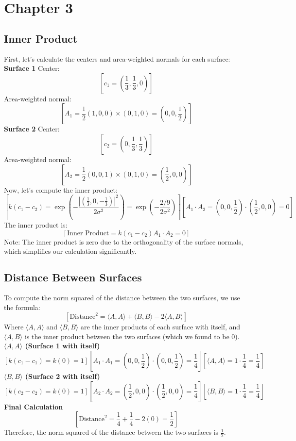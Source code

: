 \documentclass{article}
\begin{document}
\newpage
\section{Chapter 3}
\subsection{Inner Product}
First, let's calculate the centers and area-weighted normals for each surface:
\textbf{Surface 1}
Center:
$$[c_1 = \left(\frac{1}{3}, \frac{1}{3}, 0\right)]$$
Area-weighted normal:
$$[A_1 = \frac{1}{2}(1,0,0) \times (0,1,0) = \left(0, 0, \frac{1}{2}\right)]$$
\textbf{Surface 2}
Center:
$$[c_2 = \left(0, \frac{1}{3}, \frac{1}{3}\right)]$$
Area-weighted normal:
$$[A_2 = \frac{1}{2}(0,0,1) \times (0,1,0) = \left(\frac{1}{2}, 0, 0\right)]$$
Now, let's compute the inner product:
$$[k(c_1 - c_2) = \exp\left(-\frac{|\left(\frac{1}{3}, 0, -\frac{1}{3}\right)|^2}{2\sigma^2}\right) = \exp\left(-\frac{2/9}{2\sigma^2}\right)]
[A_1 \cdot A_2 = \left(0, 0, \frac{1}{2}\right) \cdot \left(\frac{1}{2}, 0, 0\right) = 0]$$
The inner product is:
$$[\text{Inner Product} = k(c_1 - c_2) A_1 \cdot A_2 = 0]$$
Note: The inner product is zero due to the orthogonality of the surface normals, which simplifies our calculation significantly.


\subsection{Distance Between Surfaces}
To compute the norm squared of the distance between the two surfaces, we use the formula:
$$[\text{Distance}^2 = \langle A, A \rangle + \langle B, B \rangle - 2\langle A, B \rangle]$$
Where $\langle A, A \rangle$ and $\langle B, B \rangle$ are the inner products of each surface with itself, and $\langle A, B \rangle$ is the inner product between the two surfaces (which we found to be 0).
\textbf{$\langle A, A \rangle$ (Surface 1 with itself)}
$$
[k(c_1 - c_1) = k(0) = 1]
[A_1 \cdot A_1 = \left(0, 0, \frac{1}{2}\right) \cdot \left(0, 0, \frac{1}{2}\right) = \frac{1}{4}]
[\langle A, A \rangle = 1 \cdot \frac{1}{4} = \frac{1}{4}]
$$
\textbf{$\langle B, B \rangle$ (Surface 2 with itself)}
$$
[k(c_2 - c_2) = k(0) = 1]
[A_2 \cdot A_2 = \left(\frac{1}{2}, 0, 0\right) \cdot \left(\frac{1}{2}, 0, 0\right) = \frac{1}{4}]
[\langle B, B \rangle = 1 \cdot \frac{1}{4} = \frac{1}{4}]
$$
\textbf{Final Calculation}
$$
[\text{Distance}^2 = \frac{1}{4} + \frac{1}{4} - 2(0) = \frac{1}{2}]$$
Therefore, the norm squared of the distance between the two surfaces is $\frac{1}{2}$.
\end{document}
